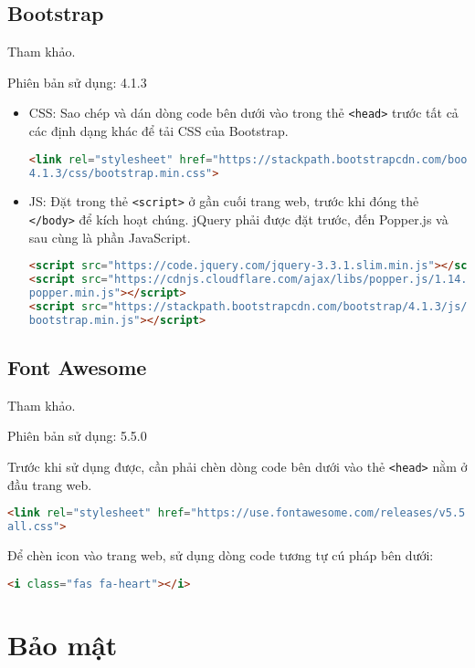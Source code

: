 \subsection{Bootstrap}
Tham khảo\cite{bootstrap}.
\par
Phiên bản sử dụng: 4.1.3
\begin{itemize}
 	\item CSS: Sao chép và dán dòng code bên dưới vào trong thẻ \texttt{<head>} trước tất cả các định dạng khác để tải CSS của Bootstrap.
 	\begin{lstlisting}[language=HTML]
<link rel="stylesheet" href="https://stackpath.bootstrapcdn.com/bootstrap/
4.1.3/css/bootstrap.min.css">
	\end{lstlisting}
	\item JS: Đặt trong thẻ \texttt{<script>} ở gần cuối trang web, trước khi đóng thẻ \texttt{</body>} để kích hoạt chúng. jQuery phải được đặt trước, đến Popper.js và sau cùng là phần JavaScript.
	\begin{lstlisting}[language=HTML]
<script src="https://code.jquery.com/jquery-3.3.1.slim.min.js"></script>
<script src="https://cdnjs.cloudflare.com/ajax/libs/popper.js/1.14.3/umd/
popper.min.js"></script>
<script src="https://stackpath.bootstrapcdn.com/bootstrap/4.1.3/js/
bootstrap.min.js"></script>
	\end{lstlisting}
\end{itemize}
\subsection{Font Awesome}
Tham khảo\cite{awesome}.
\par
Phiên bản sử dụng: 5.5.0
\par
Trước khi sử dụng được, cần phải chèn dòng code bên dưới vào thẻ \texttt{<head>} nằm ở đầu trang web.
\begin{lstlisting}[language=HTML]
<link rel="stylesheet" href="https://use.fontawesome.com/releases/v5.5.0/css/
all.css">
\end{lstlisting}
\par
Để chèn icon vào trang web, sử dụng dòng code tương tự cú pháp bên dưới:
\begin{lstlisting}[language=HTML]
<i class="fas fa-heart"></i>
\end{lstlisting}
\section{Bảo mật}
